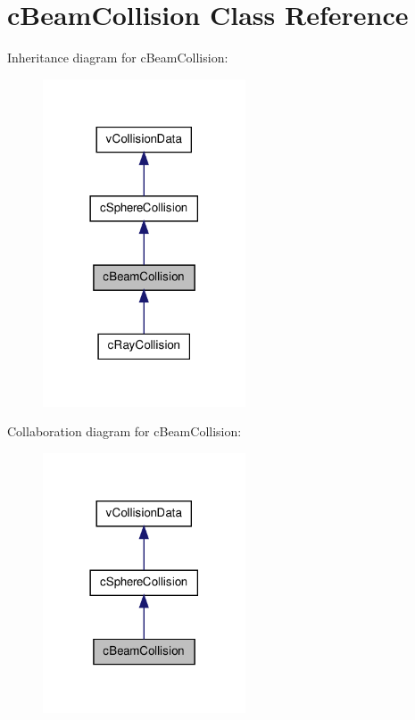 \hypertarget{classc_beam_collision}{
\section{cBeamCollision Class Reference}
\label{classc_beam_collision}
}


Inheritance diagram for cBeamCollision:
\nopagebreak
\begin{figure}[H]
\begin{center}
\leavevmode
\includegraphics[width=170pt]{classc_beam_collision__inherit__graph}
\end{center}
\end{figure}


Collaboration diagram for cBeamCollision:
\nopagebreak
\begin{figure}[H]
\begin{center}
\leavevmode
\includegraphics[width=170pt]{classc_beam_collision__coll__graph}
\end{center}
\end{figure}
